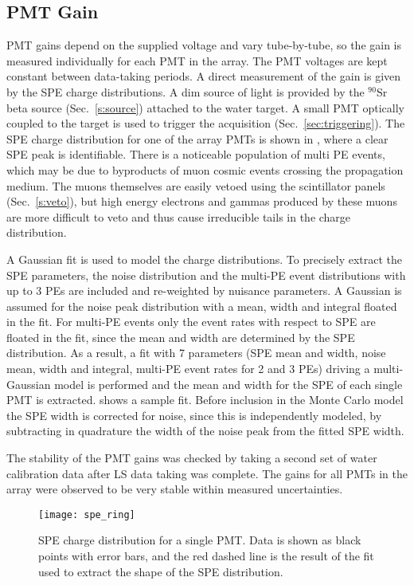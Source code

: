 \subsection{PMT Gain}
\label{pmt-gain}
PMT gains depend on the supplied voltage and vary tube-by-tube, so the gain is measured individually for each PMT in the array. The PMT voltages are kept constant between data-taking periods. A direct measurement of the gain is given by the SPE charge distributions. A dim source of light is provided by the $^{90}$Sr beta source (Sec.~\ref{s:source}) attached to the water target. 
A small PMT optically coupled to the target is used to trigger the acquisition (Sec.~\ref{sec:triggering}). The SPE charge distribution for one of the array PMTs  is shown in , where a clear SPE peak is identifiable. There is a noticeable population of multi PE events, 
which may be due to byproducts of muon cosmic events crossing the propagation medium. The muons themselves are easily vetoed using the scintillator panels (Sec.~\ref{s:veto}), but high energy electrons and gammas produced by these muons are more difficult to veto and thus cause irreducible tails in the charge distribution. 

A Gaussian fit is used to model the charge distributions. To precisely extract the SPE parameters, the noise distribution and the multi-PE event distributions with up to 3 PEs are included and re-weighted by nuisance parameters. A Gaussian is assumed for the noise peak distribution with a mean, width and integral floated in the fit. For multi-PE events only the event rates with respect to SPE are floated in the fit, since the mean and width are determined by the SPE distribution. As a result, a fit with 7 parameters (SPE mean and width, noise mean, width and integral, multi-PE event rates for 2 and 3 PEs) driving a multi-Gaussian model is performed and the mean and width for the SPE of each single PMT is extracted.   shows a sample fit. 
Before inclusion in the Monte Carlo model the SPE width is corrected for noise, since this is independently modeled, 
by subtracting in quadrature the width of the noise peak from the fitted SPE width.

The stability of the PMT gains was checked by taking a second set of water calibration data after LS data taking was complete.  The gains for all PMTs in the array were observed to be very stable within measured uncertainties.

\begin{figure}
	\centering
	\texttt{[image: spe\_ring]}
	\caption{SPE charge distribution for a single PMT. Data is shown as black points with error bars, and the red dashed line is the result of the fit used to extract the shape of the SPE distribution. }
	\label{fig:spe_data}
\end{figure}


